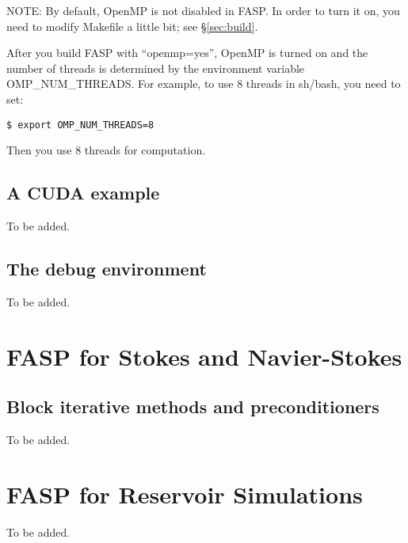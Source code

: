 \documentclass[11pt]{memoir}
\begin{document}
\begin{snugshade}\noindent
NOTE: By default, OpenMP is not disabled in FASP. In order to turn it on, you need to modify Makefile a little bit; see \S\ref{sec:build}.
\end{snugshade}

After you build FASP with ``openmp=yes'', OpenMP is turned on and the number of threads is determined by the environment variable OMP\_NUM\_THREADS. For example, to use 8 threads in {\color{red} sh/bash}, you need to set:
\begin{lstlisting}[numbers=none]
$ export OMP_NUM_THREADS=8
\end{lstlisting}
Then you use 8 threads for computation.

\section{A CUDA example}\label{sec:cuda}

To be added.

\section{The debug environment}\label{sec:debug}

To be added.

\chapter{FASP for Stokes and Navier-Stokes}\label{ch:ns}

\section{Block iterative methods and preconditioners}\label{sec:block}

To be added.

\chapter{FASP for Reservoir Simulations}\label{ch:blkoil}

To be added.


\end{document}
